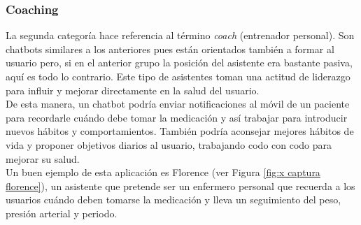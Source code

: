 \subsubsection{Coaching}
La segunda categoría hace referencia al término \textit{coach} (entrenador personal). Son chatbots similares a los anteriores pues están orientados también a formar al usuario pero, si en el anterior grupo la posición del asistente era bastante pasiva, aquí es todo lo contrario. Este tipo de asistentes toman una actitud de liderazgo para influir y mejorar directamente en la salud del usuario.\\

De esta manera, un chatbot podría enviar notificaciones al móvil de un paciente para recordarle cuándo debe tomar la medicación y así trabajar para introducir nuevos hábitos y comportamientos. También podría aconsejar mejores hábitos de vida y proponer objetivos diarios al usuario, trabajando codo con codo para mejorar su salud.\\

Un buen ejemplo de esta aplicación es Florence \cite{florence} (ver Figura \ref{fig:x captura florence}), un asistente que pretende ser un enfermero personal que recuerda a los usuarios cuándo deben tomarse la medicación y lleva un seguimiento del peso, presión arterial y periodo.\\

